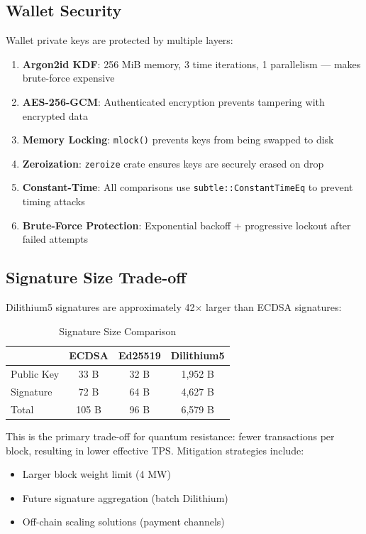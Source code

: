 \documentclass[11pt,a4paper]{article}
\begin{document}
\subsection{Wallet Security}

Wallet private keys are protected by multiple layers:

\begin{enumerate}
    \item \textbf{Argon2id KDF}: 256 MiB memory, 3 time iterations, 1 parallelism — makes brute-force expensive
    \item \textbf{AES-256-GCM}: Authenticated encryption prevents tampering with encrypted data
    \item \textbf{Memory Locking}: \texttt{mlock()} prevents keys from being swapped to disk
    \item \textbf{Zeroization}: \texttt{zeroize} crate ensures keys are securely erased on drop
    \item \textbf{Constant-Time}: All comparisons use \texttt{subtle::ConstantTimeEq} to prevent timing attacks
    \item \textbf{Brute-Force Protection}: Exponential backoff + progressive lockout after failed attempts
\end{enumerate}

\subsection{Signature Size Trade-off}

Dilithium5 signatures are approximately 42$\times$ larger than ECDSA signatures:

\begin{table}[H]
\centering
\caption{Signature Size Comparison}
\begin{tabular}{@{}lccc@{}}
\toprule
& \textbf{ECDSA} & \textbf{Ed25519} & \textbf{Dilithium5} \\
\midrule
Public Key & 33 B & 32 B & 1,952 B \\
Signature & 72 B & 64 B & 4,627 B \\
Total & 105 B & 96 B & 6,579 B \\
\bottomrule
\end{tabular}
\end{table}

This is the primary trade-off for quantum resistance: fewer transactions per block, resulting in lower effective TPS. Mitigation strategies include:

\begin{itemize}[leftmargin=*]
    \item Larger block weight limit (4 MW)
    \item Future signature aggregation (batch Dilithium)
    \item Off-chain scaling solutions (payment channels)
\end{itemize}
\end{document}
